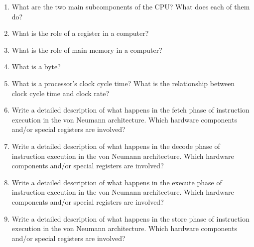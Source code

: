 \documentclass[12pt]{article}
\begin{document}
\begin{enumerate}
\item What are the two main subcomponents of the CPU? What does each of them do?
\vfill
\item What is the role of a register in a computer?
\vfill
\item What is the role of main memory in a computer?
\vfill
\item What is a byte?
\vfill
\item What is a processor's clock cycle time? What is the relationship between clock cycle time and clock rate?
\vfill

\pagebreak

\item Write a detailed description of what happens in the fetch phase of instruction execution in the von Neumann architecture. Which hardware components and/or special registers are involved?
\vfill
\item Write a detailed description of what happens in the decode phase of instruction execution in the von Neumann architecture. Which hardware components and/or special registers are involved?
\vfill
\item Write a detailed description of what happens in the execute phase of instruction execution in the von Neumann architecture. Which hardware components and/or special registers are involved?
\vfill
\item Write a detailed description of what happens in the store phase of instruction execution in the von Neumann architecture. Which hardware components and/or special registers are involved?
\end{enumerate}

\vfill

\standardsfooter


\newpage
\end{document}
